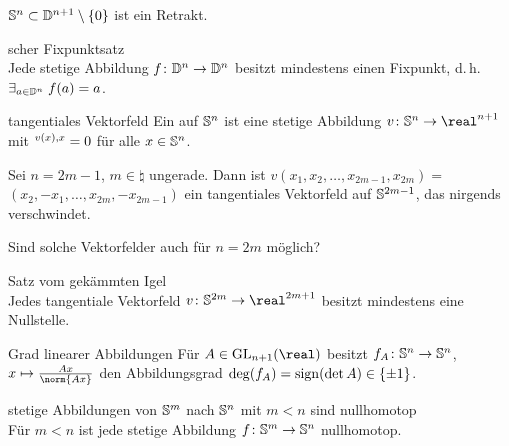 \begin{Bem}
    $\mathbb{S}^n \subset \mathbb{D}^{n+1} \setminus \{0\}$ ist ein Retrakt.
\end{Bem}

\begin{Satz}{scher Fixpunktsatz}\\
    Jede stetige Abbildung $f\colon \mathbb{D}^n \rightarrow \mathbb{D}^n$
    besitzt mindestens einen Fixpunkt, d.\,h.
    $\exists_{a \in \mathbb{D}^n}\; f(a) = a$.
\end{Satz}

\linie

\begin{Def}{tangentiales Vektorfeld}
    Ein  auf $\mathbb{S}^n$ ist eine
    stetige Abbildung $v\colon \sphere^n \rightarrow \real^{n+1}$
    mit $\sp{v(x), x} = 0$ für alle $x \in \mathbb{S}^n$.
\end{Def}

\begin{Bsp}
    Sei $n = 2m - 1$, $m \in \natural$ ungerade.
    Dann ist $v(x_1, x_2, \dots, x_{2m-1}, x_{2m}) =$ \\
    $(x_2, -x_1, \dotsc, x_{2m}, -x_{2m-1})$ ein tangentiales Vektorfeld auf
    $\mathbb{S}^{2m-1}$, das nirgends verschwindet.
\end{Bsp}

\begin{Bem}
    Sind solche Vektorfelder auch für $n = 2m$ möglich?
\end{Bem}

\begin{Satz}{Satz vom gekämmten Igel}\\
    Jedes tangentiale Vektorfeld
    $v\colon \sphere^{2m} \rightarrow \real^{2m+1}$
    besitzt mindestens eine Nullstelle.
\end{Satz}

\begin{Lemma}{Grad linearer Abbildungen}
    Für $A \in \GL_{n+1}(\real)$ besitzt
    $f_A\colon \mathbb{S}^n \rightarrow \mathbb{S}^n$,
    $x \mapsto \frac{Ax}{\norm{Ax}}$ den Abbildungsgrad
    $\deg(f_A) = \operatorname{sign}(\det A) \in \{\pm 1\}$.
\end{Lemma}

\linie

\begin{Satz}{stetige Abbildungen von $\mathbb{S}^m$ nach
             $\mathbb{S}^n$ mit $m < n$ sind nullhomotop}\\
    Für $m < n$ ist jede stetige Abbildung
    $f\colon \mathbb{S}^m \rightarrow \mathbb{S}^n$ nullhomotop.
\end{Satz}

